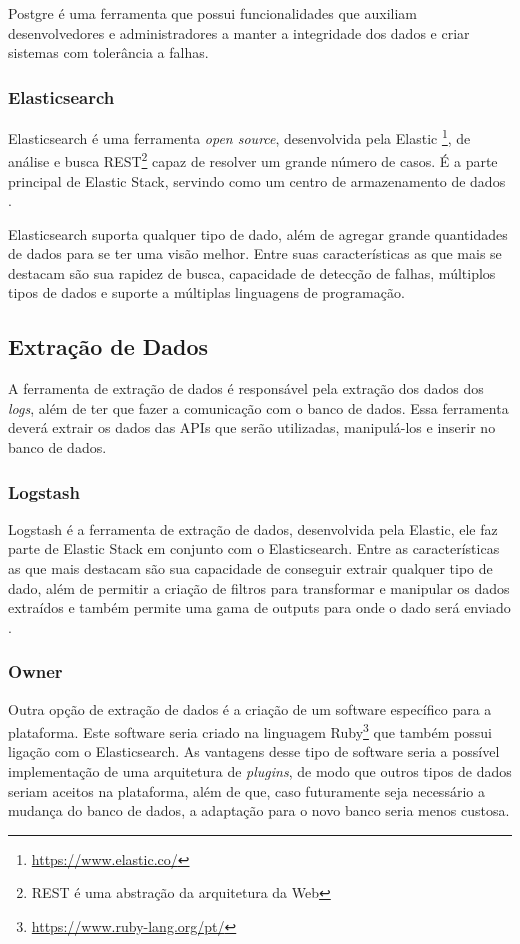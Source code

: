 Postgre é uma ferramenta que possui funcionalidades que auxiliam desenvolvedores e administradores a manter a integridade dos dados e criar sistemas com tolerância a falhas.
\subsubsection*{Elasticsearch}
Elasticsearch é uma ferramenta \textit{open source}, desenvolvida pela Elastic \footnote[1]{\url{https://www.elastic.co/}}, de análise e busca REST\footnote[2]{REST é uma abstração da arquitetura da Web} capaz de resolver um grande número de casos. É a parte principal de Elastic Stack, servindo como um centro de armazenamento de dados \cite{elasticsearch}.

Elasticsearch suporta qualquer tipo de dado, além de agregar grande quantidades de dados para se ter uma visão melhor. Entre suas características as que mais se destacam são sua rapidez de busca, capacidade de detecção de falhas, múltiplos tipos de dados e suporte a múltiplas linguagens de programação.
\subsection{Extração de Dados}
A ferramenta de extração de dados é responsável pela extração dos dados dos \textit{logs}, além de ter que fazer a comunicação com o banco de dados. Essa ferramenta deverá extrair os dados das APIs que serão utilizadas, manipulá-los e inserir no banco de dados.
\subsubsection*{Logstash}
Logstash é a ferramenta de extração de dados, desenvolvida pela Elastic, ele faz parte de Elastic Stack em conjunto com o Elasticsearch. Entre as características as que mais destacam são sua capacidade de conseguir extrair qualquer tipo de dado, além de permitir a criação de filtros para transformar e manipular os dados extraídos e também permite uma gama de outputs para onde o dado será enviado \cite{logstash}.
\subsubsection*{Owner}
Outra opção de extração de dados é a criação de um software específico para a plataforma. Este software seria criado na linguagem Ruby\footnote[3]{\url{https://www.ruby-lang.org/pt/}} que também possui ligação com o Elasticsearch. As vantagens desse tipo de software seria a possível implementação de uma arquitetura de \textit{\textit{plugins}}, de modo que outros tipos de dados seriam aceitos na plataforma, além de que, caso futuramente seja necessário a mudança do banco de dados, a adaptação para o novo banco seria menos custosa.
